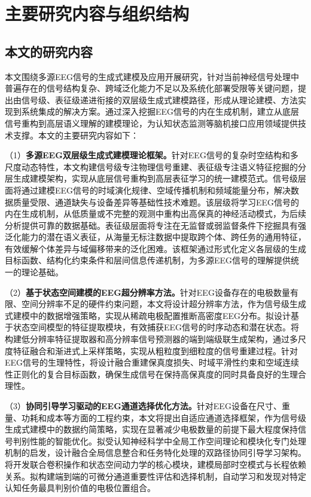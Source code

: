 \section{主要研究内容与组织结构}
\subsection{本文的研究内容}
本文围绕多源EEG信号的生成式建模及应用开展研究，针对当前神经信号处理中普遍存在的信号结构复杂、跨域泛化能力不足以及系统化部署受限等关键问题，提出由信号级、表征级递进衔接的双层级生成式建模路径，形成从理论建模、方法实现到系统集成的解决方案。通过深入挖掘EEG信号的内在生成机制，建立从底层信号重构到高层语义理解的建模理论，为认知状态监测等脑机接口应用领域提供技术支撑。本文的主要研究内容如下：

（1）\textbf{多源EEG双层级生成式建模理论框架。}针对EEG信号的复杂时空结构和多尺度动态特性，本文构建信号级专注物理信号重建、表征级专注语义特征挖掘的分层生成建模架构，实现从底层信号重构到高层表征学习的统一建模范式。信号级层面将通过建模EEG信号的时域演化规律、空域传播机制和频域能量分布，解决数据质量受限、通道缺失与设备差异等基础性技术难题。该层级将学习EEG信号的内在生成机制，从低质量或不完整的观测中重构出高保真的神经活动模式，为后续分析提供可靠的数据基础。表征级层面将专注在无监督或弱监督条件下挖掘具有强泛化能力的潜在语义表征，从海量无标注数据中提取跨个体、跨任务的通用特征，有效缓解个体差异与域偏移带来的泛化困难。该框架通过形式化定义各层级的生成目标函数、结构化约束条件和层间信息传递机制，为多源EEG信号的理解提供统一的理论基础。

（2）\textbf{基于状态空间建模的EEG超分辨率方法。}针对EEG设备存在的电极数量有限、空间分辨率不足的硬件约束问题，本文将设计超分辨率方法，作为信号级生成式建模中的数据增强策略，实现从稀疏电极配置推断高密度EEG分布。拟设计基于状态空间模型的特征提取模块，有效捕获EEG信号的时序动态和潜在状态。将构建低分辨率特征提取器和高分辨率信号预测器的端到端级联生成架构，通过多尺度特征融合和渐进式上采样策略，实现从粗粒度到细粒度的信号重建过程。针对EEG信号的生理特性，将设计融合重建保真度损失、时域平滑性约束和空域连续性正则化的复合目标函数，确保生成信号在保持高保真度的同时具备良好的生理合理性。

（3）\textbf{协同引导学习驱动的EEG通道选择优化方法。}针对EEG设备在尺寸、重量、功耗和成本等方面的工程约束，本文将提出自适应通道选择框架，作为信号级生成式建模中的数据约简策略，实现在显著减少电极数量的前提下最大程度保持信号判别性能的智能优化。拟受认知神经科学中全局工作空间理论和模块化专门处理机制的启发，设计融合全局信息整合和任务特化处理的双路径协同引导学习架构。将开发联合卷积操作和状态空间动力学的核心模块，建模局部时空模式与长程依赖关系。拟构建端到端的可微分通道重要性评估和选择机制，自动学习和发现对特定认知任务最具判别价值的电极位置组合。

